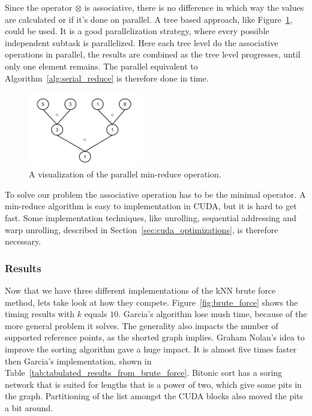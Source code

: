 Since the operator $\otimes$ is associative, there is no difference in which way the values are calculated or if it's done on parallel. A tree based approach, like Figure~\ref{fig:paralell_reduce_operation}, could be used. It is a good parallelization strategy, where every possible independent subtask is parallelized. Here each tree level do the associative operations in parallel, the results are combined as the tree level progresses, until only one element remains. The parallel equivalent to Algorithm~\ref{alg:serial_reduce} is therefore done in  time. 

\begin{figure}[ht!]
\centering
\includegraphics[width=50mm]{../gfx/min_reduce.png}

\caption{A visualization of the parallel min-reduce operation.}
\label{fig:paralell_reduce_operation}
\end{figure}

To solve our problem the associative operation has to be the minimal operator. A min-reduce algorithm is easy to implementation in CUDA, but it is hard to get fast. Some implementation techniques, like unrolling, sequential addressing and warp unrolling, described in Section~\ref{sec:cuda_optimizations}, is therefore necessary.   

\subsubsection{Results} %
\label{ssub:comparison}

Now that we have three different implementations of the kNN brute force method, lets take look at how they compete. Figure~\ref{fig:brute_force} shows the timing results with $k$ equals $10$. Garcia's algorithm lose mush time, because of the more general problem it solves. The generality also impacts the number of supported reference points, as the shorted graph implies. Graham Nolan's idea to improve the sorting algorithm gave a huge impact. It is almost five times faster then Garcia's implementation, shown in Table~\ref{tab:tabulated_results_from_brute_force}. Bitonic sort has a soring network that is suited for lengths that is a power of two, which give some pits in the graph. Partitioning of the list amongst the CUDA blocks also moved the pits a bit around.  


